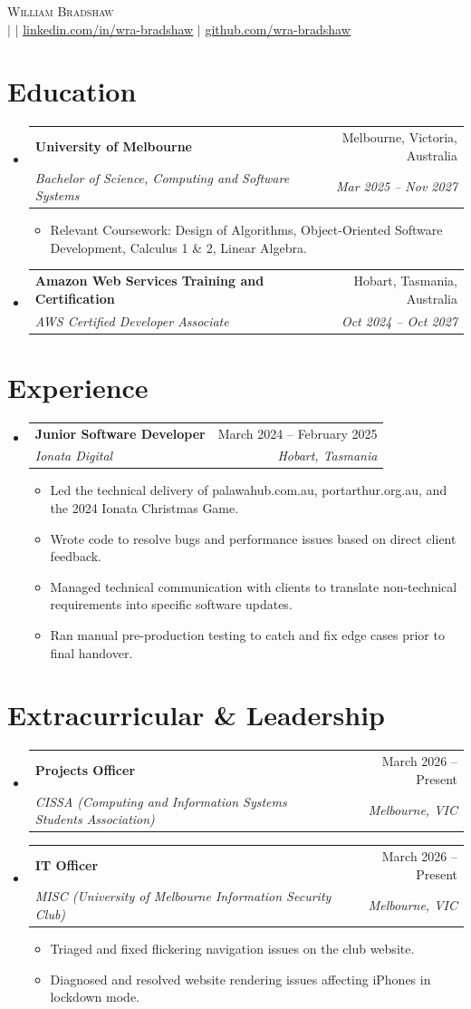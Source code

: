 \documentclass{article}
\makeatletter
\newcommand{\resumeItem}[1]{
  \item\small{
    {#1 \vspace{-2pt}}
  }
}
\newcommand{\resumeSubheading}[4]{
  \vspace{-2pt}\item
    \begin{tabular*}{0.97\textwidth}[t]{l@{\extracolsep{\fill}}r}
      \textbf{#1} & #2 \\
      \textit{\small#3} & \textit{\small #4} \\
    \end{tabular*}\vspace{-7pt}
}
\newcommand{\resumeSubHeadingListStart}{\begin{itemize}[leftmargin=0.15in, label={}]}
\newcommand{\resumeSubHeadingListEnd}{\end{itemize}}
\newcommand{\resumeItemListStart}{\begin{itemize}}
\newcommand{\resumeItemListEnd}{\end{itemize}\vspace{-5pt}}
\makeatother
\begin{document}
\begin{center}
    {\Large\scshape William Bradshaw}  \\ \vspace{1pt}
    \small {}  $|$ \href{mailto:\Secret{email}}{\underline{}}  $|$
    \href{https://linkedin.com/in/wra-bradshaw}{\underline{linkedin.com/in/wra-bradshaw}}  $|$
    \href{https://github.com/wra-bradshaw}{\underline{github.com/wra-bradshaw}}
\end{center}

\section{Education}
  \resumeSubHeadingListStart
    \resumeSubheading
      {University of Melbourne}{Melbourne, Victoria, Australia}
      {Bachelor of Science, Computing and Software Systems}{Mar 2025 -- Nov 2027}
      \resumeItemListStart
        \resumeItem{Relevant Coursework: Design of Algorithms, Object-Oriented Software Development, Calculus 1 \& 2, Linear Algebra.}
      \resumeItemListEnd

    \resumeSubheading
      {Amazon Web Services Training and Certification}{Hobart, Tasmania, Australia}
      {AWS Certified Developer Associate}{Oct 2024 -- Oct 2027}
  \resumeSubHeadingListEnd

\section{Experience}
  \resumeSubHeadingListStart
    \resumeSubheading
      {Junior Software Developer}{March 2024 -- February 2025}
      {Ionata Digital}{Hobart, Tasmania}
      \resumeItemListStart
        \resumeItem{Led the technical delivery of palawahub.com.au, portarthur.org.au, and the 2024 Ionata Christmas Game.}
        \resumeItem{Wrote code to resolve bugs and performance issues based on direct client feedback.}
        \resumeItem{Managed technical communication with clients to translate non-technical requirements into specific software updates.}
        \resumeItem{Ran manual pre-production testing to catch and fix edge cases prior to final handover.}
      \resumeItemListEnd
  \resumeSubHeadingListEnd

\section{Extracurricular \& Leadership}
  \resumeSubHeadingListStart
    \resumeSubheading
      {Projects Officer}{March 2026 -- Present}
      {CISSA (Computing and Information Systems Students Association)}{Melbourne, VIC}
    \resumeSubheading
      {IT Officer}{March 2026 -- Present}
      {MISC (University of Melbourne Information Security Club)}{Melbourne, VIC}
    \resumeItemListStart
        \resumeItem{Triaged and fixed flickering navigation issues on the club website.}
        \resumeItem{Diagnosed and resolved website rendering issues affecting iPhones in lockdown mode.}
      \resumeItemListEnd
  \resumeSubHeadingListEnd
\end{document}
